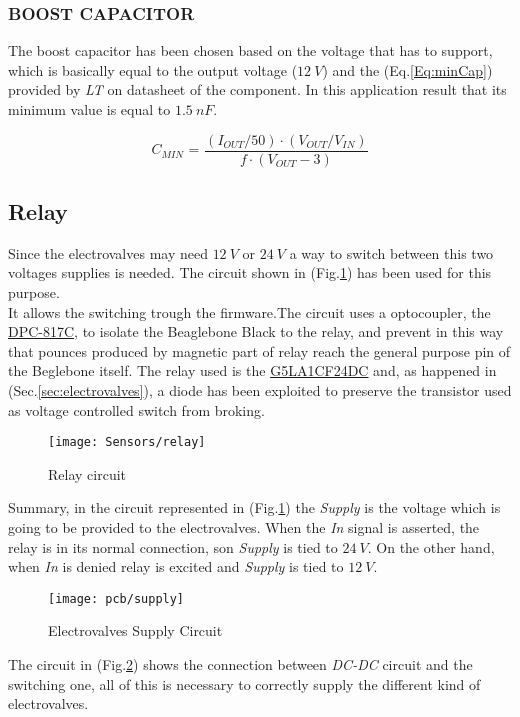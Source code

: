 \subsubsection{BOOST CAPACITOR}
The boost capacitor has been chosen based on the voltage that has to support, which is basically equal to the output voltage ($12\ V$) and the (Eq.\ref{Eq:minCap}) provided by \textit{LT} on datasheet of the component. In this application result that its minimum value is equal to $1.5\ nF$.

\begin{equation}
C_{MIN} \text{ = } \frac{\left(I_{OUT} / 50 \right) \cdot \left( V_{OUT} / V_{IN}\right)}{f \cdot \left(V_{OUT} - 3\right)}
\label{Eq:minCap}
\end{equation} 

\subsection{Relay}

Since the electrovalves may need $12\ V$ or $24\ V$ a way to switch between this two voltages supplies is needed. The circuit shown in (Fig.\ref{Fig:relay}) has been used for this purpose.\\
It allows the switching trough the firmware.The circuit uses a optocoupler, the \href{http://www.keepjump.com.tw/DataSheet/Others/DPC-817C.pdf}{DPC-817C}, to isolate the Beaglebone Black to the relay, and prevent in this way that pounces produced by magnetic part of relay reach the general purpose pin of the Beglebone itself. The relay used is the \href{http://www.rlocman.ru/i/File/dat/Omron/Relays/G5LA145DC.pdf}{G5LA1CF24DC} and, as happened in (Sec.\ref{sec:electrovalves}), a diode has been exploited to preserve the transistor used as voltage controlled switch from broking. 

\begin{figure}[h]
	\begin{center}
		\texttt{[image: Sensors/relay]}
		\caption{Relay circuit}
		\label{Fig:relay}
	\end{center}
\end{figure}

Summary, in the circuit represented  in (Fig.\ref{Fig:relay}) the \textit{Supply} is the voltage which is going to be provided to the electrovalves. When the \textit{In} signal is asserted, the relay is in its normal connection, son \textit{Supply} is tied to $24\ V$. On the other hand, when \textit{In} is denied relay is excited and \textit{Supply} is tied to $12\ V$.
\newpage

\begin{figure}[t]
	\centering
	\texttt{[image: pcb/supply]}
	\caption{Electrovalves Supply Circuit}
	\label{Fig:supply}
\end{figure}

The circuit in (Fig.\ref{Fig:supply}) shows the connection between \textit{DC-DC} circuit and the switching one, all of this is necessary to correctly supply the different kind of electrovalves.

